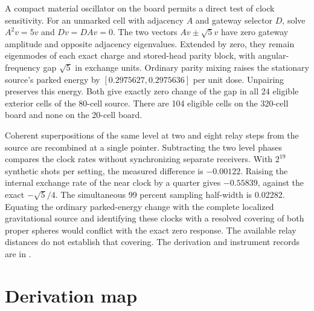 \documentclass[11pt]{article}
\begin{document}
A compact material oscillator on the board permits a direct test of
clock sensitivity. For an unmarked cell with adjacency \(A\) and
gateway selector \(D\), solve \(A^2v=5v\) and \(Dv=DAv=0\).
The two vectors \(Av\pm\sqrt5 v\) have zero gateway amplitude and
opposite adjacency eigenvalues. Extended by zero, they remain
eigenmodes of each exact charge and stored-head parity block, with
angular-frequency gap \(\sqrt5\) in exchange units. Ordinary parity
mixing raises the stationary source's parked energy by
\([0.2975627,0.2975636]\) per unit dose. Unpairing preserves this
energy. Both give exactly zero change of the gap in all 24 eligible
exterior cells of the 80-cell source. There are 104 eligible cells on
the 320-cell board and none on the 20-cell board.

Coherent superpositions of the same level at two and eight relay steps
from the source are recombined at a single pointer. Subtracting the two
level phases compares the clock rates without synchronizing separate
receivers. With \(2^{19}\) synthetic shots per setting, the measured
difference is \(-0.00122\). Raising the internal exchange rate of the
near clock by a quarter gives \(-0.55839\), against the exact
\(-\sqrt5/4\). The simultaneous 99 percent sampling half-width is
0.02282. Equating the ordinary parked-energy change with the complete
localized gravitational source and identifying these clocks with a
resolved covering of both proper spheres would conflict with the
exact zero response. The available relay distances do not establish
that covering. The derivation and instrument records are in
.

\section*{Derivation map}
\end{document}
